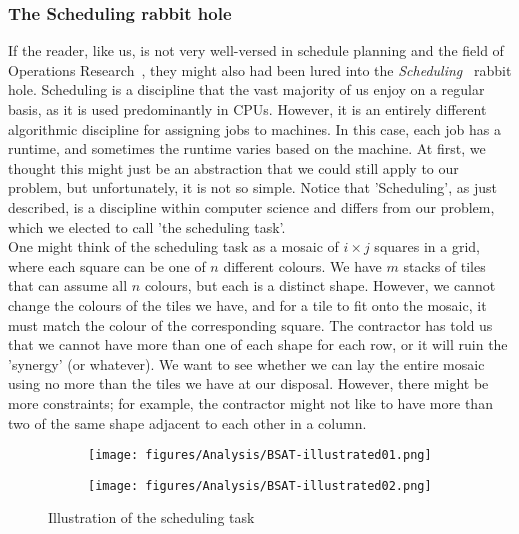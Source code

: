 \subsubsection*{The Scheduling rabbit hole}
If the reader, like us, is not very well-versed in schedule planning and the field of Operations Research~\cite{Wiki-Operations-Research}, they might also had been lured into the \emph{Scheduling}~\cite{Wiki-Scheduling-computing, Wiki-Optimal-job-scheduling, Wiki-Job-shop-scheduling} rabbit hole. Scheduling is a discipline that the vast majority of us enjoy on a regular basis, as it is used predominantly in CPUs. However, it is an entirely different algorithmic discipline for assigning jobs to machines. In this case, each job has a runtime, and sometimes the runtime varies based on the machine. At first, we thought this might just be an abstraction that we could still apply to our problem, but unfortunately, it is not so simple. Notice that 'Scheduling', as just described, is a discipline within computer science and differs from our problem, which we elected to call 'the scheduling task'.
\\
One might think of the scheduling task as a mosaic of \(i \times j\) squares in a grid, where each square can be one of \(n\) different colours. We have \(m\) stacks of tiles that can assume all \(n\) colours, but each is a distinct shape. However, we cannot change the colours of the tiles we have, and for a tile to fit onto the mosaic, it must match the colour of the corresponding square. The contractor has told us that we cannot have more than one of each shape for each row, or it will ruin the 'synergy' (or whatever). We want to see whether we can lay the entire mosaic using no more than the tiles we have at our disposal. However, there might be more constraints; for example, the contractor might not like to have more than two of the same shape adjacent to each other in a column.
\begin{figure}[H]
    \centering
    \begin{subfigure}[t]{0.73\textwidth}
        \centering
        \texttt{[image: figures/Analysis/BSAT-illustrated01.png]}
    \end{subfigure}
    \hfill
    \begin{subfigure}[t]{0.225\textwidth}
        \centering
        \texttt{[image: figures/Analysis/BSAT-illustrated02.png]}
    \end{subfigure}
    \caption{Illustration of the scheduling task}
    \label{fig:the-scheduling-task-illustrated}
\end{figure}

